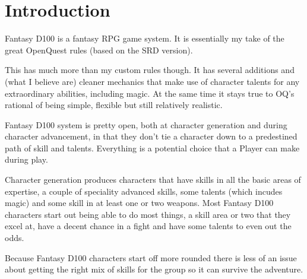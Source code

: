 \chapter{Introduction}
\label{ch:introduction}

Fantasy D100 is a fantasy RPG game system. It is essentially my take of the great OpenQuest rules (based on the SRD version).

This has much more than my custom rules though. It has several additions and (what I believe are) cleaner mechanics that make use of character talents for any extraordinary abilities, including magic. At the same time it stays true to OQ's rational of being simple, flexible but still relatively realistic.

Fantasy D100 system is pretty open, both at character generation and during character advancement, in that they don’t tie a character down to a predestined path of skill and talents. Everything is a potential choice that a Player can make during play.

Character generation produces characters that have skills in all the basic areas of expertise, a couple of speciality advanced skills, some talents (which incudes magic) and some skill in at least one or two weapons. Most Fantasy D100 characters start out being able to do most things, a skill area or two that they excel at, have a decent chance in a fight and have some talents to even out the odds.

Because Fantasy D100 characters start off more rounded there is less of an issue about getting the right mix of skills for the group so it can survive the adventure.


